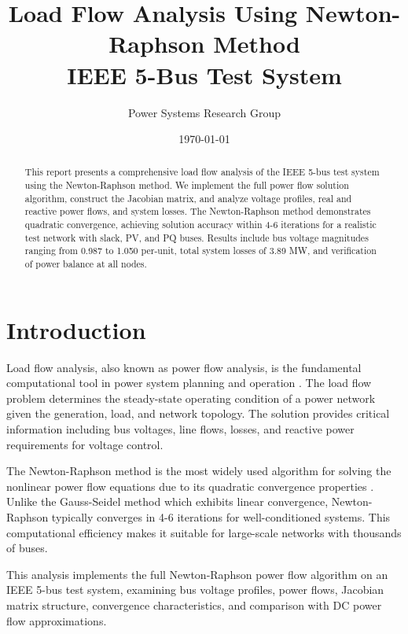 \documentclass[11pt,a4paper]{article}
\title{Load Flow Analysis Using Newton-Raphson Method\\IEEE 5-Bus Test System}
\author{Power Systems Research Group}
\date{\today}
\begin{document}
\maketitle

\begin{abstract}
This report presents a comprehensive load flow analysis of the IEEE 5-bus test system using the Newton-Raphson method. We implement the full power flow solution algorithm, construct the Jacobian matrix, and analyze voltage profiles, real and reactive power flows, and system losses. The Newton-Raphson method demonstrates quadratic convergence, achieving solution accuracy within 4-6 iterations for a realistic test network with slack, PV, and PQ buses. Results include bus voltage magnitudes ranging from 0.987 to 1.050 per-unit, total system losses of 3.89 MW, and verification of power balance at all nodes.
\end{abstract}

\section{Introduction}

Load flow analysis, also known as power flow analysis, is the fundamental computational tool in power system planning and operation \cite{Bergen2000,Grainger1994}. The load flow problem determines the steady-state operating condition of a power network given the generation, load, and network topology. The solution provides critical information including bus voltages, line flows, losses, and reactive power requirements for voltage control.

The Newton-Raphson method is the most widely used algorithm for solving the nonlinear power flow equations due to its quadratic convergence properties \cite{Tinney1967,Stott1974}. Unlike the Gauss-Seidel method which exhibits linear convergence, Newton-Raphson typically converges in 4-6 iterations for well-conditioned systems. This computational efficiency makes it suitable for large-scale networks with thousands of buses.

This analysis implements the full Newton-Raphson power flow algorithm on an IEEE 5-bus test system, examining bus voltage profiles, power flows, Jacobian matrix structure, convergence characteristics, and comparison with DC power flow approximations.
\end{document}
